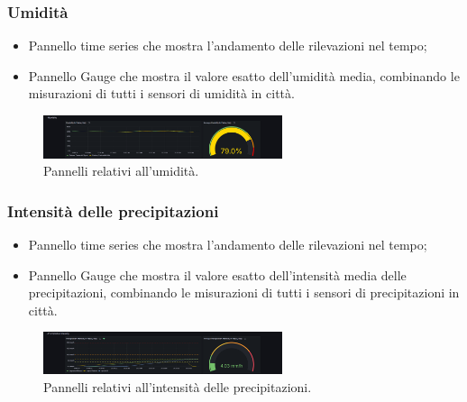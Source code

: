 \documentclass[8pt]{article}
\begin{document}
\subsubsection{Umidità}
\begin{itemize}
\setlength\itemsep{0em}
    \item Pannello time series che mostra l'andamento delle rilevazioni nel tempo;
    \item Pannello Gauge che mostra il valore esatto dell'umidità media, combinando le misurazioni di tutti i sensori di umidità in città.
\end{itemize}
\begin{figure}[H]
    \centering
    \includegraphics[width=7cm]{images_mu/humidity.png}
    \caption{Pannelli relativi all'umidità.}
    \label{fig:Pannelli relativi all'umidità}
\end{figure}
\subsubsection{Intensità delle precipitazioni}
\begin{itemize}
\setlength\itemsep{0em}
    \item Pannello time series che mostra l'andamento delle rilevazioni nel tempo;
    \item Pannello Gauge che mostra il valore esatto dell'intensità media delle precipitazioni, combinando le misurazioni di tutti i sensori di precipitazioni in città.
\end{itemize}
\begin{figure}[H]
    \centering
    \includegraphics[width=7cm]{images_mu/precipitation_intensity.png}
    \caption{Pannelli relativi all'intensità delle precipitazioni.}
    \label{fig:Pannelli relativi all'intensità delle precipitazioni}
\end{figure}
\end{document}
